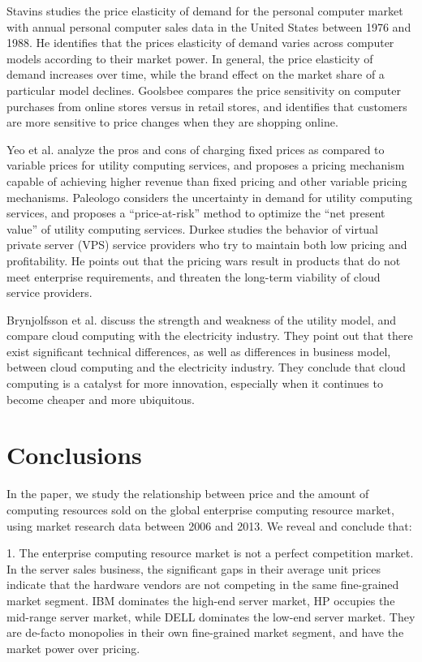 \documentclass[10pt,journal,cspaper,compsoc]{IEEEtran}
\begin{document}
Stavins \cite{stavins} studies the price elasticity of demand for the personal computer market with annual personal computer sales data in the United States between 1976 and 1988. He identifies that the prices elasticity of demand varies across computer models according to their market power. In general, the price elasticity of demand increases over time, while the brand effect on the market share of a particular model declines. Goolsbee \cite{goolsbee} compares the price sensitivity on computer purchases from online stores versus in retail stores, and identifies that customers are more sensitive to price changes when they are shopping online. 

Yeo et al. \cite{yeo} analyze the pros and cons of charging fixed prices as compared to variable prices for utility computing services, and proposes a pricing mechanism capable of achieving higher revenue than fixed pricing and other variable pricing mechanisms. Paleologo \cite{paleologo} considers the uncertainty in demand for utility computing services, and proposes a ``price-at-risk'' method to optimize the ``net present value'' of utility computing services. Durkee \cite{durkee} studies the behavior of virtual private server (VPS) service providers who try to maintain both low pricing and profitability. He points out that the pricing wars result in products that do not meet enterprise requirements, and threaten the long-term viability of cloud service providers. 

Brynjolfsson et al. \cite{erik} discuss the strength and weakness of the utility model, and compare cloud computing with the electricity industry. They point out that there exist significant technical differences, as well as differences in business model, between cloud computing and the electricity industry. They conclude that cloud computing is a catalyst for more innovation, especially when it continues to become cheaper and more ubiquitous. 

\section{Conclusions}
\label{sec:conclusions}

In the paper, we study the relationship between price and the amount of computing resources sold on the global enterprise computing resource market, using market research data between 2006 and 2013. We reveal and conclude that:


1. The enterprise computing resource market is not a perfect competition market. In the server sales business, the significant gaps in their average unit prices indicate that the hardware vendors are not competing in the same fine-grained market segment. IBM dominates the high-end server market, HP occupies the mid-range server market, while DELL dominates the low-end server market. They are de-facto monopolies in their own fine-grained market segment, and have the market power over pricing.
\end{document}
